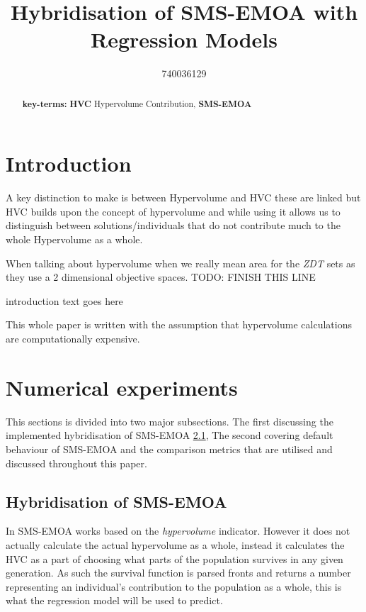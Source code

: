 \documentclass[sigconf,review,nonacm]{acmart}
\begin{document}
\title[Hybrid SMS-EMOA]{Hybridisation of SMS-EMOA with Regression Models}
\author{740036129}

\begin{abstract}
 \blindtext 

 \textbf{key-terms:}
    \textbf{HVC} Hypervolume Contribution,
    \textbf{SMS-EMOA}
\end{abstract}

\maketitle

\section{Introduction}

A key distinction to make is between Hypervolume and HVC these are linked but HVC builds upon the concept of hypervolume and while using it allows us to distinguish between solutions/individuals that do not contribute much to the whole Hypervolume as a whole. 

When talking about hypervolume when we really mean area for the \textit{ZDT} sets as they use a 2 dimensional objective spaces. TODO: FINISH THIS LINE 

 \blindtext 
 \blindtext 

introduction text goes here 

This whole paper is written with the assumption that hypervolume calculations are computationally expensive. 

\balance

\section{Numerical experiments}

This sections is divided into two major subsections. The first discussing the implemented hybridisation of SMS-EMOA \ref{hybrid}, The second covering default behaviour of SMS-EMOA and the comparison metrics that are utilised and discussed throughout this paper. 

\subsection{Hybridisation of SMS-EMOA}
\label{hybrid}

In SMS-EMOA works based on the \textit{hypervolume} indicator. However it does not actually calculate the actual hypervolume as a whole, instead it calculates the HVC as a part of choosing what parts of the population survives in any given generation. As such the survival function is parsed fronts and returns a number representing an individual's contribution to the population as a whole, this is what the regression model will be used to predict. \\
\end{document}
